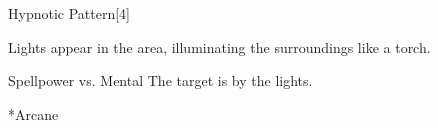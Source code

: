 \begin{spellsection}{Hypnotic Pattern}[4]
    \begin{spellheader}
    \end{spellheader}
    \begin{spellcontent}
        \begin{spelltargetinginfo}
        \end{spelltargetinginfo}
        \begin{spelleffects}
            \spelleffect Lights appear in the area, illuminating the surroundings like a torch.
            \spelldur \durshort
        \end{spelleffects}
    \end{spellcontent}
    \begin{spellsubcontent}
        \begin{spelltargetinginfo}
        \end{spelltargetinginfo}
        \begin{spelleffects}
            \begin{spellattack}{Spellpower vs. Mental}
                \spellsuccess The target is \fascinated by the lights.
            \end{spellattack}
        \end{spelleffects}
    \end{spellsubcontent}
    \begin{spellfooter}
        *{Arcane}
        \miscastyou
    \end{spellfooter}
\end{spellsection}

